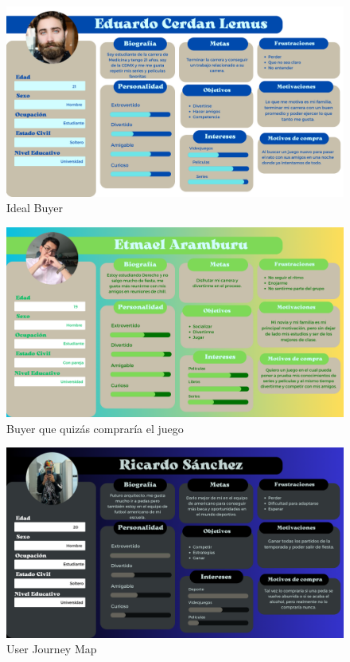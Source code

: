 \documentclass[12pt, oneside, letterpaper]{book}
\begin{document}
\begin{figure}[h]
\includegraphics[width=1.2\columnwidth]{IdealBuyerFN.png}%
\caption{Ideal Buyer }%
\label{IBFN}%
\end{figure}

\begin{figure}[h]
\includegraphics[width=1.2\columnwidth]{MehIdealBuyerFN.png}%
\caption{Buyer que quizás compraría el juego}%
\label{MBFN}%
\end{figure}

\begin{figure}[h]
\includegraphics[width=1.2\columnwidth]{NotIdealBuyerFN.png}%
\caption{User Journey Map }%
\label{NIBFN}%
\end{figure}
\end{document}
